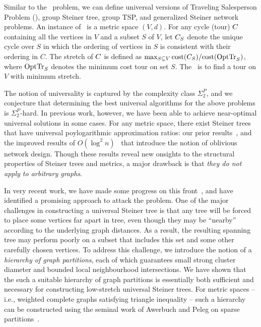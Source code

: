 Similar to the \ust\ problem, we can define universal versions of
Traveling Salesperson Problem (\utsp), group Steiner tree, group TSP,
and generalized Steiner network problems.  An instance of \utsp\ is a
metric space $(V,d)$.  For any cycle (tour) $C$ containing all the
vertices in $V$ and a subset $S$ of $V$, let $C_S$ denote the unique
cycle over $S$ in which the ordering of vertices in $S$ is consistent
with their ordering in $C$.  The stretch of $C$ is defined as
$\max_{S\subseteq V} \mbox{cost}(C_{S})/\mbox{cost}(\mbox{OptTr}_{S})$, where $\mbox{OptTr}_{S}$
denotes the minimum cost tour on set $S$. The \utsp\ is to find a tour
on $V$ with minimum stretch.


The notion of universality is captured by the complexity class
$\Sigma_2^P$, and we conjecture that determining the best universal
algorithms for the above problems is $\Sigma^P_2$-hard.  In previous
work, however, we have been able to achieve near-optimal universal
solutions in some cases.  For any metric space, there exist Steiner
trees that have universal poylogarithmic approximation ratios: our
prior results~\cite{jia+lnrs:universal}, and the improved results of
$O(\log^2 n)$~\cite{gupta+hr:oblivious} that introduce the notion of
oblivious network design.  Though these results reveal new onsights to
the structural properties of Steiner trees and metrics, a major
drawback is that {\em they do not apply to arbitrary graphs}.

In very recent work, we have made some progress on this
front~\cite{busch+drrs:ust}, and have identified a promising approach
to attack the problem.  One of the major challenges in constructing a
universal Steiner tree is that any tree will be forced to place some
vertices far apart in tree, even though they may be ``nearby''
according to the underlying graph distances.  As a result, the
resulting spanning tree may perform poorly on a subset that includes
this set and some other carefully chosen vertices.  To address this
challenge, we introduce the notion of a {\em hierarchy of graph
  partitions}, each of which guarantees small strong cluster diameter
and bounded local neighbourhood intersections.  We have shown that the
such a suitable hierarchy of graph partitions is essentially both
sufficient and necessary for constructing low-stretch universal
Steiner trees.  For metric spaces -- i.e., weighted complete graphs
satisfying triangle inequality -- such a hierarchy can be constructed
using the seminal work of Awerbuch and Peleg on sparse
partitions~\cite{awerbuch+p:partition,peleg:distributeBook}.

